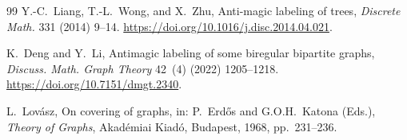 \documentclass[preprint,12pt]{elsarticle}
\begin{document}
\begin{thebibliography}{99}
Y.-C.~Liang, T.-L.~Wong, and X.~Zhu,
Anti-magic labeling of trees,
\emph{Discrete Math.} 331 (2014) 9--14.
\newblock \url{https://doi.org/10.1016/j.disc.2014.04.021}.

K.~Deng and Y.~Li,
Antimagic labeling of some biregular bipartite graphs,
\emph{Discuss. Math. Graph Theory} 42~(4) (2022) 1205--1218.
\newblock \url{https://doi.org/10.7151/dmgt.2340}.

L.~Lov\'asz,
On covering of graphs,
in: P.~Erd\H{o}s and G.O.H.~Katona (Eds.),
\emph{Theory of Graphs},
Akad\'emiai Kiad\'o, Budapest, 1968, pp.~231--236.

\end{thebibliography}
\end{document}
